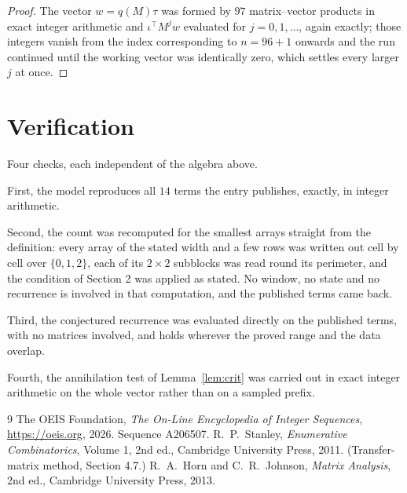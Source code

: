 \documentclass[11pt,a4paper]{article}
\theoremstyle{plain}
\theoremstyle{definition}
\begin{document}
\begin{proof}
The vector $w=q(M)\tau$ was formed by $97$ matrix--vector products in exact integer
arithmetic and $\iota^{\!\top}M^{j}w$ evaluated for $j=0,1,\dots$, again exactly; those
integers vanish from the index corresponding to $n=96+1$ onwards and the run continued
until the working vector was identically zero, which settles every larger $j$ at once.
\end{proof}

\section{Verification}

Four checks, each independent of the algebra above.

First, the model reproduces all $14$ terms the entry publishes, exactly, in integer
arithmetic.

Second, the count was recomputed for the smallest arrays straight from the definition: every
array of the stated width and a few rows was written out cell by cell over $\{0,1,2\}$, each of
its $2\times2$ subblocks was read round its perimeter, and the condition of Section 2 was
applied as stated. No window, no state and no recurrence is involved in that computation, and
the published terms came back.

Third, the conjectured recurrence was evaluated directly on the published terms, with no
matrices involved, and holds wherever the proved range and the data overlap.

Fourth, the annihilation test of Lemma~\ref{lem:crit} was carried out in exact integer
arithmetic on the whole vector rather than on a sampled prefix.

\begin{thebibliography}{9}
 The OEIS Foundation, \emph{The On-Line Encyclopedia of Integer
Sequences}, \url{https://oeis.org}, 2026. Sequence A206507.
 R.~P.~Stanley, \emph{Enumerative Combinatorics}, Volume 1, 2nd ed.,
Cambridge University Press, 2011. (Transfer-matrix method, Section 4.7.)
 R.~A.~Horn and C.~R.~Johnson, \emph{Matrix Analysis}, 2nd ed., Cambridge
University Press, 2013.
\end{thebibliography}
\end{document}
